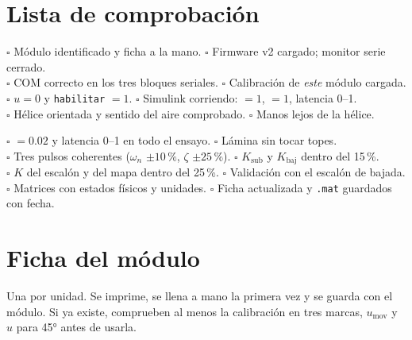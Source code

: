 \documentclass[11pt,letterpaper]{article}
\newcommand{\sen}[1]{\texttt{\detokenize{#1}}}             %
\begin{document}
\section{Lista de comprobación}

\begin{tcolorbox}[enhanced,colback=white,colframe=verdeOK,boxrule=0.6pt,sharp corners=south,title=Antes de encender la fuente,fonttitle=\bfseries\small,coltitle=white,colbacktitle=verdeOK]
\small
$\square$ Módulo identificado y ficha a la mano. \quad $\square$ Firmware v2 cargado; monitor serie cerrado.\\
$\square$ COM correcto en los tres bloques seriales. \quad $\square$ Calibración de \emph{este} módulo cargada.\\
$\square$ $u=0$ y \texttt{habilitar} $=1$. \quad $\square$ Simulink corriendo: \sen{estado} $=1$, \sen{valido} $=1$, latencia 0--1.\\
$\square$ Hélice orientada y sentido del aire comprobado. \quad $\square$ Manos lejos de la hélice.
\end{tcolorbox}

\begin{tcolorbox}[enhanced,colback=white,colframe=azulEIA,boxrule=0.6pt,sharp corners=south,title=Antes de aceptar un modelo,fonttitle=\bfseries\small,coltitle=white,colbacktitle=azulEIA]
\small
$\square$ \sen{diff(t_ard)} $=0.02$ y latencia 0--1 en todo el ensayo. \quad $\square$ Lámina sin tocar topes.\\
$\square$ Tres pulsos coherentes ($\omega_n$ $\pm10\,\%$, $\zeta$ $\pm25\,\%$). \quad $\square$ $K_\text{sub}$ y $K_\text{baj}$ dentro del 15\,\%.\\
$\square$ $K$ del escalón y del mapa dentro del 25\,\%. \quad $\square$ Validación con el escalón de bajada.\\
$\square$ Matrices con estados físicos y unidades. \quad $\square$ Ficha actualizada y \texttt{.mat} guardados con fecha.
\end{tcolorbox}

\appendix
\renewcommand{\thesection}{\Alph{section}}

\clearpage
\section{Ficha del módulo}\label{sec:ficha}

Una por unidad. Se imprime, se llena a mano la primera vez y se guarda con el módulo. Si ya existe, comprueben al menos la calibración en tres marcas, $u_\text{mov}$ y $u$ para 45° antes de usarla.
\end{document}
